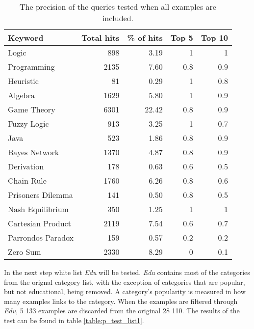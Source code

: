 \begin{table}[H]
\centering
\begin{tabular} {|| p{10em} | r | r | r | r ||} 
 \hline
 Keyword & Total hits & \% of hits & Top 5 & Top 10 \\ [0.5ex] 
 \hline

Logic & 898 & 3.19 & 1 & 1 \\
Programming & 2135 & 7.60 & 0.8 & 0.9 \\
Heuristic & 81 & 0.29 & 1 & 0.8 \\
Algebra & 1629 & 5.80 & 1 & 0.9 \\
Game Theory & 6301 & 22.42 & 0.8 & 0.9 \\
\hline
Fuzzy Logic & 913 & 3.25 & 1 & 0.7 \\
Java & 523 & 1.86 & 0.8 & 0.9 \\
Bayes Network & 1370 & 4.87 & 0.8 & 0.9 \\
Derivation & 178 & 0.63 & 0.6 & 0.5 \\
\hline
Chain Rule & 1760 & 6.26 & 0.8 & 0.6 \\
Prisoners Dilemma & 141 & 0.50 & 0.8 & 0.5 \\
Nash Equilibrium & 350 & 1.25 & 1 & 1 \\
Cartesian Product & 2119 & 7.54 & 0.6 & 0.7 \\
Parrondos Paradox & 159 & 0.57 &  0.2 & 0.2 \\
Zero Sum & 2330 & 8.29 & 0 & 0.1 \\

 \hline
\end{tabular}
\caption{The precision of the queries tested when all examples are included.}
\label{table:p_test_no-list}
\end{table}

In the next step white list \textit{Edu} will be tested. \textit{Edu} contains most of the categories from the orignal category list, with the exception of categories that are popular, but not educational, being removed. A category's popularity is measured in how many examples links to the category. When the examples are filtered through \textit{Edu}, 5 133 examples are discarded from the original 28 110. The results of the test can be found in table \ref{table:p_test_list1}.

